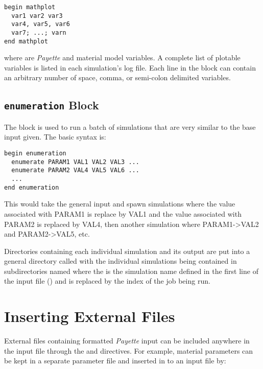 \documentclass[letterpaper,10pt,english]{sphinxmanual}
\begin{document}
\begin{Verbatim}[commandchars=\\\{\}]
begin mathplot
  var1 var2 var3
  var4, var5, var6
  var7; ...; varn
end mathplot
\end{Verbatim}

where  are \emph{Payette} and material model variables. A complete list of
plotable variables is listed in each simulation's log file. Each line in the
 block can contain an arbitrary number of space, comma, or semi-colon
delimited variables.


\subsection{\texttt{enumeration} Block}
\label{Files/input_file_formatting:enumeration-block}
The  block is used to run a batch of simulations that are
very similar to the base input given. The basic syntax is:

\begin{Verbatim}[commandchars=\\\{\}]
begin enumeration
  enumerate PARAM1 VAL1 VAL2 VAL3 ...
  enumerate PARAM2 VAL4 VAL5 VAL6 ...
  ...
end enumeration
\end{Verbatim}

This would take the general input and spawn simulations where the value associated
with PARAM1 is replace by VAL1 and the value associated with PARAM2 is replaced by
VAL4, then another simulation where PARAM1-\textgreater{}VAL2 and PARAM2-\textgreater{}VAL5, etc.

Directories containing each individual simulation and its output are put into a
general directory called  with the individual simulations being
contained in subdirectories named  where the  is the simulation
name defined in the first line of the input file () and  is
replaced by the index of the job being run.


\section{Inserting External Files}
\label{Files/input_file_formatting:inserting-files}\label{Files/input_file_formatting:inserting-external-files}
External files containing formatted \emph{Payette} input can be included anywhere in
the input file through the  and  directives. For
example, material parameters can be kept in a separate parameter file and
inserted in to an input file by:
\end{document}
